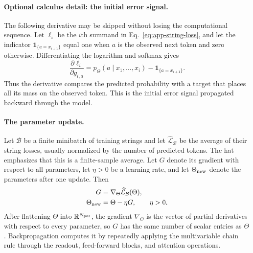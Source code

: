 \documentclass[
  aps,
  reprint,
  superscriptaddress,
  floatfix,
  nofootinbib,
  longbibliography
]{revtex4-2}
\newcommand{\R}{\mathbb{R}}
\begin{document}
\paragraph{Optional calculus detail: the initial error signal.}
The following derivative may be skipped without losing the computational
sequence.  Let
$\ell_i$ be the $i$th summand in Eq.~\eqref{eq:app-string-loss}, and let the
indicator $\mathbf 1_{\{a=x_{i+1}\}}$ equal one when $a$ is the observed next
token and zero otherwise.  Differentiating the logarithm and softmax gives
\begin{equation}
\label{eq:app-softmax-derivative}
\frac{\partial\ell_i}{\partial g_{i,a}}
=p_\Theta(a\mid x_1,\ldots,x_i)
-\mathbf 1_{\{a=x_{i+1}\}}.
\end{equation}
Thus the derivative compares the predicted probability with a target that
places all its mass on the observed token.  This is the initial error signal
propagated backward through the model.

\paragraph{The parameter update.}
Let $\mathcal B$ be a finite minibatch of training strings and let
$\widehat{\mathcal L}_{\mathcal B}$ be the average of their string losses,
usually normalized by the number of predicted tokens.  The hat emphasizes that
this is a finite-sample average.  Let $G$ denote its gradient with respect to
all parameters, let $\eta>0$ be a learning rate, and let $\Theta_{\rm new}$
denote the parameters after one update.  Then
\begin{equation}
\label{eq:app-training-update}
\begin{aligned}
G&=\nabla_\Theta
\widehat{\mathcal L}_{\mathcal B}(\Theta),\\
\Theta_{\rm new}&=\Theta-\eta G,
\qquad \eta>0.
\end{aligned}
\end{equation}
After flattening $\Theta$ into $\R^{N_{\rm par}}$, the gradient
$\nabla_\Theta$ is the vector of partial derivatives with respect to every
parameter, so $G$ has the same number of scalar entries as $\Theta$.
Backpropagation computes it by repeatedly applying the multivariable chain rule
through the readout, feed-forward blocks, and attention operations.
\end{document}
